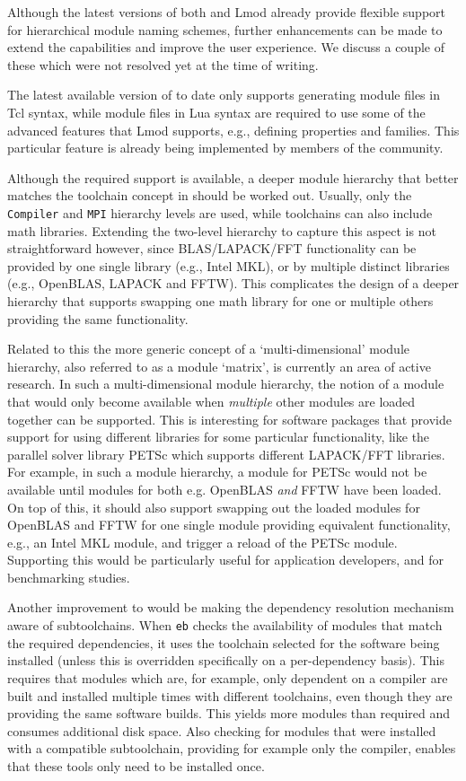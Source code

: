 Although the latest versions of both \easybuild{} and Lmod already provide
flexible support for hierarchical module naming schemes, further enhancements can
be made to extend the capabilities and improve the user experience. We discuss
a couple of these which were not resolved yet at the time of writing.

The latest available version of \easybuild{} to date only supports generating
module files in Tcl syntax, while module files in Lua syntax are required to use
some of the advanced features that Lmod supports, e.g., defining properties and
families. This particular feature is already being implemented by members of the
\easybuild{} community.

Although the required support is available, a deeper module hierarchy that
better matches the toolchain concept in \easybuild{} should be worked out.
Usually, only the \texttt{Compiler} and \texttt{MPI} hierarchy levels are used,
while \easybuild{} toolchains can also include math libraries. Extending
the two-level hierarchy to capture this aspect is not straightforward however,
since BLAS/LAPACK/FFT functionality can be provided by one single library (e.g.,
Intel MKL), or by multiple distinct libraries (e.g., OpenBLAS, LAPACK and FFTW).
This complicates the design of a deeper hierarchy that supports swapping one
math library for one or multiple others providing the same functionality.

Related to this the more generic concept of a `multi-dimensional' module hierarchy,
also referred to as a module `matrix', is currently an area of active research.
In such a multi-dimensional module hierarchy, the notion of a module that would
only become available when \emph{multiple} other modules are loaded together can be
supported. This is interesting for software packages that provide support for using
different libraries for some particular functionality, like the parallel
solver library PETSc which supports different LAPACK/FFT libraries. For example,
in such a module hierarchy, a module for PETSc would not be available until modules
for both e.g. OpenBLAS \emph{and} FFTW have been loaded. On top of this, it should
also support swapping out the loaded modules for OpenBLAS and FFTW for one single
module providing equivalent functionality, e.g., an Intel MKL module, and trigger a
reload of the PETSc module. Supporting this would be particularly useful for
application developers, and for benchmarking studies.


Another improvement to \easybuild{} would be making the dependency resolution
mechanism aware of subtoolchains. When \texttt{eb} checks the availability of
modules that match the required dependencies, it uses the toolchain selected
for the software being installed (unless this is overridden specifically on a
per-dependency basis). This requires that modules which are, for example, only
dependent on a compiler are built and installed multiple times with different
toolchains, even though they are providing the same software builds. This yields
more modules than required and consumes additional disk space. Also checking for
modules that were installed with a compatible subtoolchain, providing for example
only the compiler, enables that these tools only need to be installed once.

